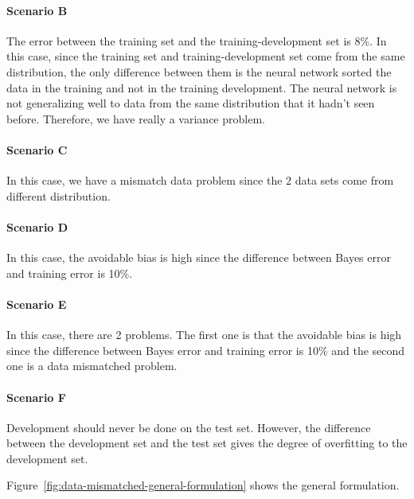 \documentclass[UTF8]{article}
\begin{document}
\paragraph{Scenario B}
The error between the training set and the training-development set is 8\%. In this case, since the
training set and training-development set come from the same distribution, the only difference
between them is the neural network sorted the data in the training and not in the training
development. The neural network is not generalizing well to data from the same distribution that it
hadn't seen before. Therefore, we have really a variance problem.

\paragraph{Scenario C}
In this case, we have a mismatch data problem since the 2 data sets come from different
distribution.

\paragraph{Scenario D}
In this case, the avoidable bias is high since the difference between Bayes error and training
error is 10\%.

\paragraph{Scenario E}
In this case, there are 2 problems. The first one is that the avoidable bias is high since the
difference between Bayes error and training error is 10\% and the second one is a data mismatched
problem.

\paragraph{Scenario F}
Development should never be done on the test set. However, the difference between the development
set and the test set gives the degree of overfitting to the development set.

Figure~\ref{fig:data-mismatched-general-formulation} shows the general formulation.
\end{document}

